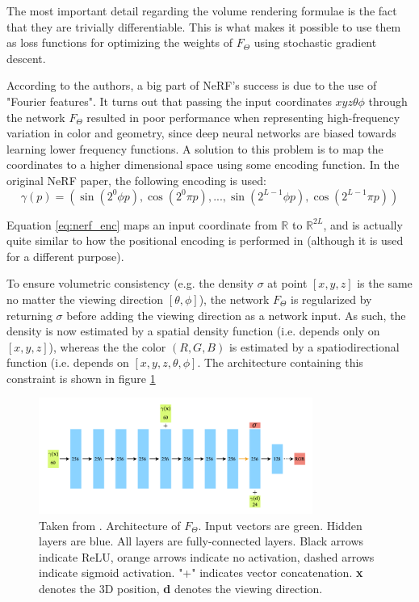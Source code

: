The most important detail regarding the volume rendering formulae is the fact that they are trivially differentiable. This is what makes it possible to use them as loss functions for optimizing the weights of $F_\Theta$ using stochastic gradient descent.

According to the authors, a big part of NeRF's success is due to the use of "Fourier features"\cite{fourer-features2020}. It turns out that passing the input coordinates $xyz\theta\phi$ through the network $F_\Theta$ resulted in poor performance when representing high-frequency variation in color and geometry, since deep neural networks are biased towards learning lower frequency functions. A solution to this problem is to map the coordinates to a higher dimensional space using some encoding function. In the original NeRF paper, the following encoding is used:
\begin{equation}
    \gamma(p) = \left(\sin(2^0 \phi p), \cos(2^0\pi p), ..., \sin(2^{L-1} \phi p), \cos(2^{L-1}\pi p) \right)
    \label{eq:nerf_enc}
\end{equation}

Equation \ref{eq:nerf_enc} maps an input coordinate from $\mathbb{R}$ to $\mathbb{R}^{2L}$, and is actually quite similar to how the positional encoding is performed in \cite{vaswani2017} (although it is used for a different purpose).

To ensure volumetric consistency (e.g. the density $\sigma$ at point $[x,y,z]$ is the same no matter the viewing direction $[\theta,\phi]$), the network $F_\Theta$ is regularized by returning $\sigma$ before adding the viewing direction as a network input. As such, the density is now estimated by a spatial density function (i.e. depends only on $[x,y,z]$), whereas the the color $(R,G,B)$ is estimated by a spatiodirectional function (i.e. depends on $[x,y,z,\theta,\phi]$. The architecture containing this constraint is shown in figure \ref{fig:nerf-arch}
\begin{figure}[H]
    \centering
    \includegraphics[width=0.8\textwidth]{figures/nerf-arch.png}
    \caption{Taken from \cite{nerf2020}. Architecture of $F_\Theta$. Input vectors are green. Hidden layers are blue. All layers are fully-connected layers. Black arrows indicate ReLU, orange arrows indicate no activation, dashed arrows indicate sigmoid activation. "+" indicates vector concatenation. \textbf{x} denotes the 3D position, \textbf{d} denotes the viewing direction.}
    \label{fig:nerf-arch}
\end{figure}


